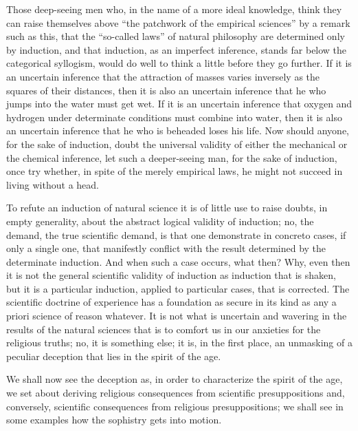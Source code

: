 \documentclass[12pt]{book}
\newcommand{\opage}[1]{\marginnote{\footnotesize\textit{[#1]}}}
\begin{document}
Those deep-seeing men who, in the name of a more ideal knowledge, think
they can raise themselves above ``the patchwork of the empirical
sciences'' by a remark such as this, that the ``so-called laws'' of
natural philosophy are determined only by induction, and that induction,
as an imperfect inference, stands far below the categorical syllogism,
would do well to think a little before they go further. If it is an
uncertain inference that the attraction of masses varies inversely as
the squares of their distances, then it is also an uncertain inference
that he who jumps into the water must get wet. If it is an uncertain
inference that oxygen and hydrogen under determinate conditions must
combine into water, then it is also an uncertain inference that he who
is beheaded loses his life. Now should anyone, for the sake of
induction, doubt the universal validity of either the mechanical or the
chemical inference, let such a deeper-seeing man, for the sake of
induction, once try whether, in spite of the merely empirical laws, he
might not succeed in living without a head.

To refute an induction of natural science it is of little use to raise
doubts, in empty generality, about the abstract logical validity of
induction; no, the demand, the true scientific demand, is that one
demonstrate in concreto cases, if only a single one, that manifestly
conflict with the result determined by the
\opage{62}\setcounter{footnote}{0}%
determinate induction. And when such a case occurs, what then? Why,
even then it is not the general scientific validity of induction as
induction that is shaken, but it is a particular induction, applied to
particular cases, that is corrected. The scientific doctrine of
experience has a foundation as secure in its kind as any a priori
science of reason whatever. It is not what is uncertain and wavering in
the results of the natural sciences that is to comfort us in our
anxieties for the religious truths; no, it is something else; it is, in
the first place, an unmasking of a peculiar deception that lies in the
spirit of the age.

We shall now see the deception as, in order to characterize the spirit
of the age, we set about deriving religious consequences from
scientific presuppositions and, conversely, scientific consequences from
religious presuppositions; we shall see in some examples how the
sophistry gets into motion.
\end{document}
